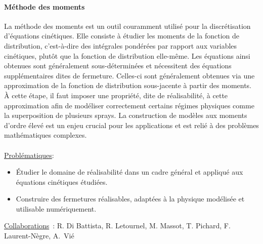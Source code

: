 \documentclass[12pt]{article}
\begin{document}
\paragraph{Méthode des moments\\ }
La méthode des moments est un outil couramment utilisé pour la discrétisation d'équations cinétiques. Elle consiste à étudier les moments de la fonction de distribution, c'est-à-dire des intégrales pondérées par rapport aux variables cinétiques, plutôt que la fonction de distribution elle-même. Les équations ainsi obtenues sont généralement sous-déterminées et nécessitent des équations supplémentaires dites de fermeture. Celles-ci sont généralement obtenues via une approximation de la fonction de distribution sous-jacente à partir des moments. À cette étape, il faut imposer une propriété, dite de réalisabilité, à cette approximation afin de modéliser correctement certains régimes physiques comme la superposition de plusieurs sprays. La construction de modèles aux moments d'ordre élevé est un enjeu crucial pour les applications et est relié à des problèmes mathématiques complexes.\\ \\
%
\underline{Problématiques}:\begin{itemize}
\item Étudier le domaine de réalisabilité dans un cadre général et appliqué aux équations cinétiques étudiées.
\item Construire des fermetures réalisables, adaptées à la physique modélisée et utilisable numériquement. \\
\end{itemize}
\underline{Collaborations}~: R. Di Battista, R. Letournel, M. Massot, T. Pichard, F. Laurent-Nègre, A.~Vié
\end{document}
